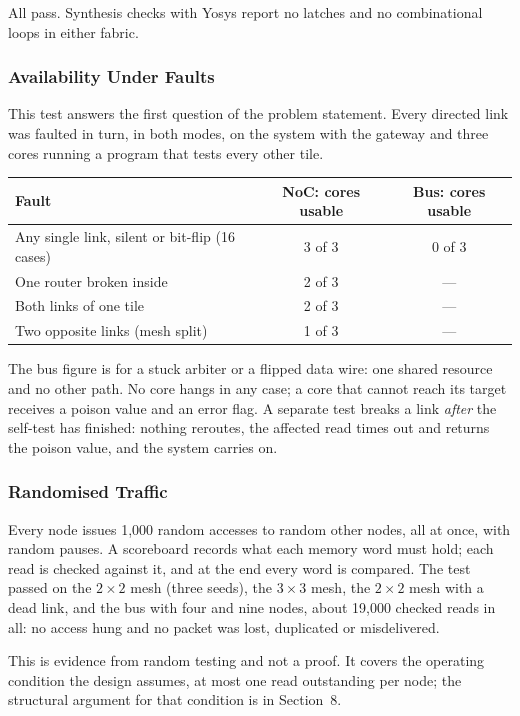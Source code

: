 \documentclass[11pt,a4paper]{article}
\begin{document}
All pass. Synthesis checks with Yosys report no latches and no combinational
loops in either fabric.

\subsubsection{Availability Under Faults}

This test answers the first question of the problem statement. Every directed
link was faulted in turn, in both modes, on the system with the gateway and
three cores running a program that tests every other tile.

\begin{tabularx}{\textwidth}{@{}Ycc@{}}
\toprule
\textbf{Fault} & \textbf{NoC: cores usable} & \textbf{Bus: cores usable} \\
\midrule
Any single link, silent or bit-flip (16 cases) & 3 of 3 & 0 of 3 \\
One router broken inside & 2 of 3 & --- \\
Both links of one tile & 2 of 3 & --- \\
Two opposite links (mesh split) & 1 of 3 & --- \\
\bottomrule
\end{tabularx}

The bus figure is for a stuck arbiter or a flipped data wire: one shared
resource and no other path. No core hangs in any case; a core that cannot
reach its target receives a poison value and an error flag. A separate test
breaks a link \emph{after} the self-test has finished: nothing reroutes, the
affected read times out and returns the poison value, and the system carries
on.

\subsubsection{Randomised Traffic}

Every node issues 1,000 random accesses to random other nodes, all at once,
with random pauses. A scoreboard records what each memory word must hold; each
read is checked against it, and at the end every word is compared. The test
passed on the $2\times2$ mesh (three seeds), the $3\times3$ mesh, the
$2\times2$ mesh with a dead link, and the bus with four and nine nodes, about
19,000 checked reads in all: no access hung and no packet was lost, duplicated
or misdelivered.

This is evidence from random testing and not a proof. It covers the operating
condition the design assumes, at most one read outstanding per node; the
structural argument for that condition is in Section~8.
\end{document}
